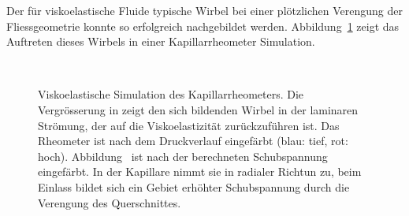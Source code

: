 Der für viskoelastische Fluide typische Wirbel bei einer plötzlichen Verengung der Fliessgeometrie \cite{Evans198611} konnte so erfolgreich nachgebildet werden. Abbildung~\ref{kapRheoVisco} zeigt das Auftreten dieses Wirbels in einer Kapillarrheometer Simulation.
%
\begin{figure}
    \centering
    \\
    \caption{Viskoelastische Simulation des Kapillarrheometers. Die Vergrösserung in  zeigt den sich bildenden Wirbel in der laminaren Strömung, der auf die Visko\-elastizität zurückzuführen ist. Das Rheometer ist nach dem Druckverlauf eingefärbt (blau: tief, rot: hoch). Abbildung~ ist nach der berechneten Schubspannung eingefärbt. In der Kapillare nimmt sie in radialer Richtun zu, beim Einlass bildet sich ein Gebiet erhöhter Schubspannung durch die Verengung des Querschnittes.}
    \label{kapRheoVisco}
\end{figure}
%

